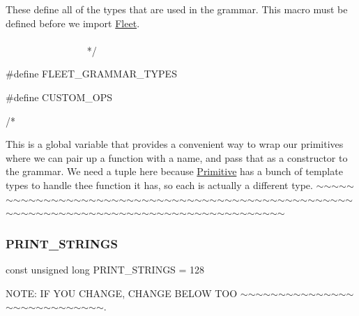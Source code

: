 \begin{DoxyCode}
    These define all of the types that are used in the grammar.
    This macro must be defined before we \textcolor{keyword}{import} \hyperlink{namespace_fleet}{Fleet}.
   ~~~~~~~~~~~~~~~~~~~~~~~~~~~~~~~~~~~~~~~~~~~~~~~~~~~~~~~~~~~~~~~~~~~~~~~~~~~~~~~~~~~~~~~~ */

\textcolor{preprocessor}{#define FLEET\_GRAMMAR\_TYPES}

\textcolor{preprocessor}{#define CUSTOM\_OPS}

\textcolor{comment}{/*}
\end{DoxyCode}
 This is a global variable that provides a convenient way to wrap our primitives where we can pair up a function with a name, and pass that as a constructor to the grammar. We need a tuple here because \hyperlink{struct_primitive}{Primitive} has a bunch of template types to handle thee function it has, so each is actually a different type. $\sim$$\sim$$\sim$$\sim$$\sim$$\sim$$\sim$$\sim$$\sim$$\sim$$\sim$$\sim$$\sim$$\sim$$\sim$$\sim$$\sim$$\sim$$\sim$$\sim$$\sim$$\sim$$\sim$$\sim$$\sim$$\sim$$\sim$$\sim$$\sim$$\sim$$\sim$$\sim$$\sim$$\sim$$\sim$$\sim$$\sim$$\sim$$\sim$$\sim$$\sim$$\sim$$\sim$$\sim$$\sim$$\sim$$\sim$$\sim$$\sim$$\sim$$\sim$$\sim$$\sim$$\sim$$\sim$$\sim$$\sim$$\sim$$\sim$$\sim$$\sim$$\sim$$\sim$$\sim$$\sim$$\sim$$\sim$$\sim$$\sim$$\sim$$\sim$$\sim$$\sim$$\sim$$\sim$$\sim$$\sim$$\sim$$\sim$$\sim$$\sim$$\sim$$\sim$$\sim$$\sim$$\sim$$\sim$$\sim$ \mbox{\label{_formal_language_theory-_complex_2_main_8cpp_a2806650ae26591d113cbc7f3d5184387}} 
\subsubsection{\texorpdfstring{P\+R\+I\+N\+T\+\_\+\+S\+T\+R\+I\+N\+GS}{PRINT\_STRINGS}}
{\footnotesize\ttfamily const unsigned long P\+R\+I\+N\+T\+\_\+\+S\+T\+R\+I\+N\+GS = 128}



N\+O\+TE\+: IF Y\+OU C\+H\+A\+N\+GE, C\+H\+A\+N\+GE B\+E\+L\+OW T\+OO $\sim$$\sim$$\sim$$\sim$$\sim$$\sim$$\sim$$\sim$$\sim$$\sim$$\sim$$\sim$$\sim$$\sim$$\sim$$\sim$$\sim$$\sim$$\sim$$\sim$$\sim$$\sim$$\sim$$\sim$$\sim$$\sim$$\sim$$\sim$. 

